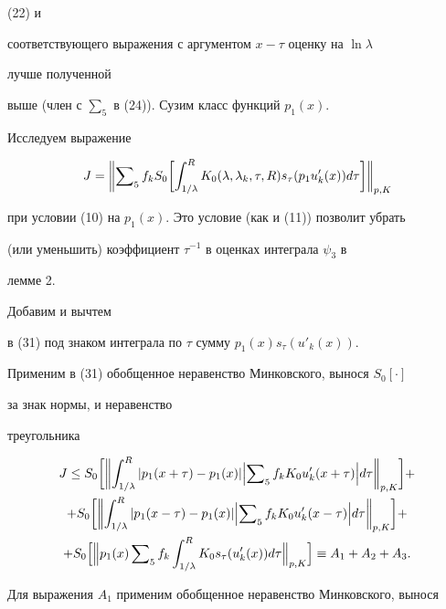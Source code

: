 {(22) и


соответствующего выражения с аргументом $x-\tau$ оценку на $\ln\lambda$


лучше полученной


выше (член с $\sum_5$ в (24)). Сузим класс функций $p_1(x)$.


Исследуем выражение


\begin{equation}


J=\biggl\|\sumn_5 f_k S_0\biggl[\int^R_{1/\lambda}


K_0(\lambda,\lambda_k,\tau,R)s_\tau


(p_1 u'_k(x))d\tau\biggr]\biggr\|_{p,K}


\end{equation}


при условии (10) на $p_1(x)$. Это условие (как и (11)) позволит убрать


(или уменьшить) коэффициент $\tau^{-1}$ в оценках интеграла $\psi_3$ в


лемме 2.


Добавим и вычтем


в (31) под знаком интеграла по $\tau$ сумму $p_1(x)s_\tau(u'_k(x))$.


Применим в (31) обобщенное неравенство Минковского, вынося $S_0[\cdot]$


за знак нормы, и неравенство


треугольника


\begin{multline}


J\le S_0\biggl[\biggl\|\int^R_{1/\lambda}|p_1(x+\tau)-


p_1(x)|\Bigl|\sumn_5 f_k K_0u'_k(x+\tau)\Bigr|d\tau


\biggr\|_{p,K}\biggr] +\\


+S_0\biggl[\biggl\|\int^R_{1/\lambda}|p_1(x-\tau)-p_1(x)|


\Bigl|\sumn_5 f_k K_0u'_k(x-\tau)\Bigr|d\tau\biggr\|_{p,K}


\biggr]+ \\


+S_0\Bigl[\Bigl\|p_1(x)\sumn_5 f_k\int^R_{1/\lambda}K_0s_\tau


(u'_k(x))d\tau\Bigr\|_{p,K}\Bigr]\equiv A_1+A_2+A_3.


\end{multline}


Для выражения $A_1$ применим обобщенное неравенство Минковского, вынося


}
